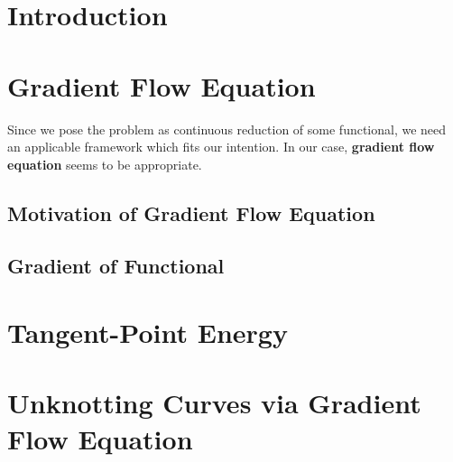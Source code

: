 \documentclass[a4paper, 12pt]{article}
\numberwithin{equation}{section}
\numberwithin{figure}{section}
\theoremstyle{definition}
\theoremstyle{plain}
\theoremstyle{plain}
\theoremstyle{plain}
\theoremstyle{remark}
\numberwithin{theorem}{section}
\begin{document}



\tableofcontents

\section{Introduction}


\section{Gradient Flow Equation}
Since we pose the problem as continuous reduction of some functional,
we need an applicable framework which fits our intention.
In our case, \textbf{gradient flow equation} seems to be appropriate.
\subsection{Motivation of Gradient Flow Equation}

\subsection{Gradient of Functional}


\section{Tangent-Point Energy}


\section{Unknotting Curves via Gradient Flow Equation}

\end{document}
